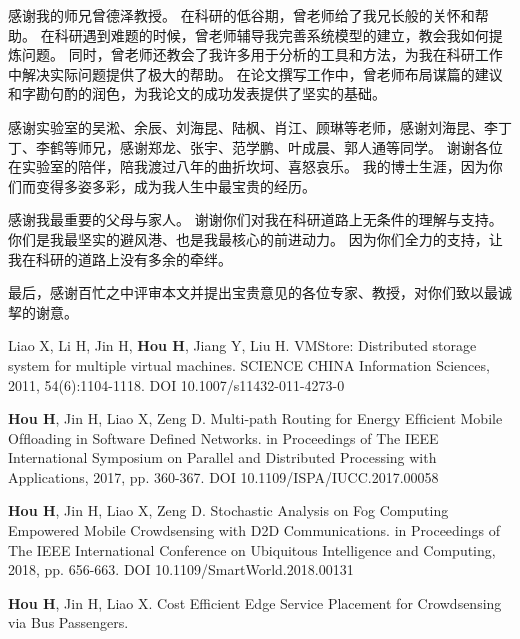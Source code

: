 \documentclass[format=draft,language=chinese,degree=phd,table,usenames,dvipsnames]{hustthesis}
\begin{document}
\begin{ack}
感谢我的师兄曾德泽教授。
在科研的低谷期，曾老师给了我兄长般的关怀和帮助。
在科研遇到难题的时候，曾老师辅导我完善系统模型的建立，教会我如何提炼问题。
同时，曾老师还教会了我许多用于分析的工具和方法，为我在科研工作中解决实际问题提供了极大的帮助。
在论文撰写工作中，曾老师布局谋篇的建议和字勘句酌的润色，为我论文的成功发表提供了坚实的基础。


感谢实验室的吴淞、余辰、刘海昆、陆枫、肖江、顾琳等老师，感谢刘海昆、李丁丁、李鹤等师兄，感谢郑龙、张宇、范学鹏、叶成晨、郭人通等同学。
谢谢各位在实验室的陪伴，陪我渡过八年的曲折坎坷、喜怒哀乐。
我的博士生涯，因为你们而变得多姿多彩，成为我人生中最宝贵的经历。

感谢我最重要的父母与家人。
谢谢你们对我在科研道路上无条件的理解与支持。
你们是我最坚实的避风港、也是我最核心的前进动力。
因为你们全力的支持，让我在科研的道路上没有多余的牵绊。

最后，感谢百忙之中评审本文并提出宝贵意见的各位专家、教授，对你们致以最诚挈的谢意。


\end{ack}



\appendix


\begin{publications}
\item Liao X, Li H, Jin H, \textbf{Hou H}, Jiang Y, Liu H. VMStore: Distributed storage system for multiple virtual machines. SCIENCE CHINA Information Sciences, 2011, 54(6):1104-1118. DOI 10.1007/s11432-011-4273-0
\item \textbf{Hou H}, Jin H, Liao X, Zeng D. Multi-path Routing for Energy Efﬁcient Mobile Ofﬂoading in Software Deﬁned Networks. in Proceedings of The IEEE International Symposium on Parallel and Distributed Processing with Applications, 2017, pp. 360-367. DOI 10.1109/ISPA/IUCC.2017.00058
\item \textbf{Hou H}, Jin H, Liao X, Zeng D. Stochastic Analysis on Fog Computing Empowered Mobile Crowdsensing with D2D Communications. in Proceedings of The IEEE International Conference on Ubiquitous Intelligence and Computing, 2018, pp. 656-663. DOI 10.1109/SmartWorld.2018.00131
\item \textbf{Hou H}, Jin H, Liao X. Cost Efficient Edge Service Placement for Crowdsensing via Bus Passengers.
\end{publications}
\end{document}
